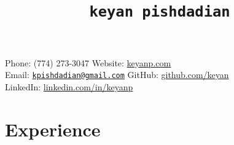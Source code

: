 \documentclass[letterpaper]{scrartcl}
\begin{document}
\title{\tt{keyan pishdadian}}

Phone: (774) 273-3047 \hfill Website: \url{keyanp.com} \\
Email: \href{mailto:kpishdadian@gmail.com}{\nolinkurl{kpishdadian@gmail.com}} \hfill GitHub: \url{github.com/keyan} \\
LinkedIn: \url{linkedin.com/in/keyanp}

%
%


%
%

\section*{Experience}
\end{document}
